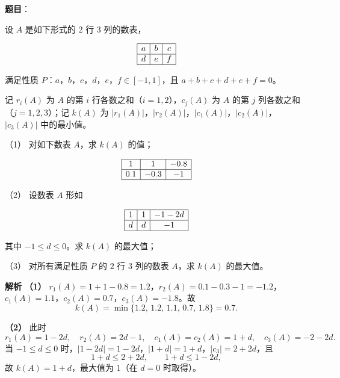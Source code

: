 \begin{answer}

\textbf{题目}：

设 $A$ 是如下形式的 $2$ 行 $3$ 列的数表，

\nopagebreak[4]
\[\begin{array}{|c|c|c|}\hline a & b & c\\ \hline d & e & f\\ \hline\end{array}\]

满足性质 $P$：$a$，$b$，$c$，$d$，$e$，$f\in[-1,1]$，且 $a+b+c+d+e+f=0$。

记 $r_i(A)$ 为 $A$ 的第 $i$ 行各数之和（$i=1,2$），$c_j(A)$ 为 $A$ 的第 $j$ 列各数之和（$j=1,2,3$）；记 $k(A)$ 为 $|r_1(A)|$，$|r_2(A)|$，$|c_1(A)|$，$|c_2(A)|$，$|c_3(A)|$ 中的最小值。

（1） 对如下数表 $A$，求 $k(A)$ 的值；

\nopagebreak[4]
\[\begin{array}{|c|c|c|}\hline 1 & 1 & -0.8\\ \hline 0.1 & -0.3 & -1\\ \hline\end{array}\]

（2） 设数表 $A$ 形如

\nopagebreak[4]
\[\begin{array}{|c|c|c|}\hline 1 & 1 & -1-2d\\ \hline d & d & -1\\ \hline\end{array}\]

其中 $-1\leqslant d\leqslant0$。求 $k(A)$ 的最大值；

（3） 对所有满足性质 $P$ 的 $2$ 行 $3$ 列的数表 $A$，求 $k(A)$ 的最大值。

\clearpage

\textbf{解析}
\textbf{（1）} $r_1(A)=1+1-0.8=1.2$，$r_2(A)=0.1-0.3-1=-1.2$，$c_1(A)=1.1$，$c_2(A)=0.7$，$c_3(A)=-1.8$。故
\nopagebreak[4]
\[k(A)=\min\{1.2,\,1.2,\,1.1,\,0.7,\,1.8\}=0.7.\]

\textbf{（2）} 此时
\nopagebreak[4]
\[r_1(A)=1-2d,\quad r_2(A)=2d-1,\quad c_1(A)=c_2(A)=1+d,\quad c_3(A)=-2-2d.\]
当 $-1\leqslant d\leqslant0$ 时，$|1-2d|=1-2d$，$|1+d|=1+d$，$|c_3|=2+2d$，且
\nopagebreak[4]
\[1+d\leqslant2+2d,\qquad 1+d\leqslant1-2d,\]
故 $k(A)=1+d$，最大值为 $1$（在 $d=0$ 时取得）。


\end{answer}
